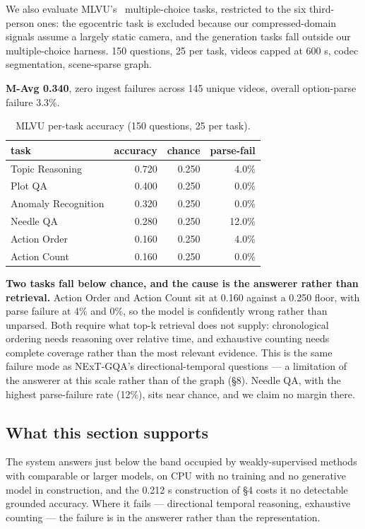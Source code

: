 \documentclass[sigconf,review,anonymous]{acmart}
\begin{document}
We also evaluate MLVU's~\cite{zhou2024mlvu} multiple-choice tasks, restricted to the six third-person ones: the
egocentric task is excluded because our compressed-domain signals assume a largely static
camera, and the generation tasks fall outside our multiple-choice harness. 150 questions, 25
per task, videos capped at 600 s, codec segmentation, scene-sparse graph.

\textbf{M-Avg 0.340}, zero ingest failures across 145 unique videos, overall option-parse failure
3.3\%.

\begin{table}[t]
\footnotesize
\setlength{\tabcolsep}{4pt}
\caption{MLVU per-task accuracy (150 questions, 25 per task).}
\begin{tabular}{lrrr}
\toprule
task & accuracy & chance & parse-fail \\
\midrule
Topic Reasoning & 0.720 & 0.250 & 4.0\% \\
Plot QA & 0.400 & 0.250 & 0.0\% \\
Anomaly Recognition & 0.320 & 0.250 & 0.0\% \\
Needle QA & 0.280 & 0.250 & 12.0\% \\
Action Order & 0.160 & 0.250 & 4.0\% \\
Action Count & 0.160 & 0.250 & 0.0\% \\
\bottomrule
\end{tabular}
\end{table}

\textbf{Two tasks fall below chance, and the cause is the answerer rather than retrieval.} Action
Order and Action Count sit at 0.160 against a 0.250 floor, with parse failure at 4\% and 0\%,
so the model is confidently wrong rather than unparsed. Both require what top-k retrieval
does not supply: chronological ordering needs reasoning over relative time, and exhaustive
counting needs complete coverage rather than the most relevant evidence. This is the same
failure mode as NExT-GQA's directional-temporal questions --- a limitation of the answerer at
this scale rather than of the graph (§8). Needle QA, with the highest parse-failure
rate (12\%), sits near chance, and we claim no margin there.

\subsection{What this section supports}

The system answers just below the band occupied by weakly-supervised methods with comparable
or larger models, on CPU with no training and no generative model in construction, and the
0.212 s construction of §4 costs it no detectable grounded accuracy.
Where it fails --- directional temporal reasoning, exhaustive counting --- the failure is in the
answerer rather than the representation.
\end{document}
